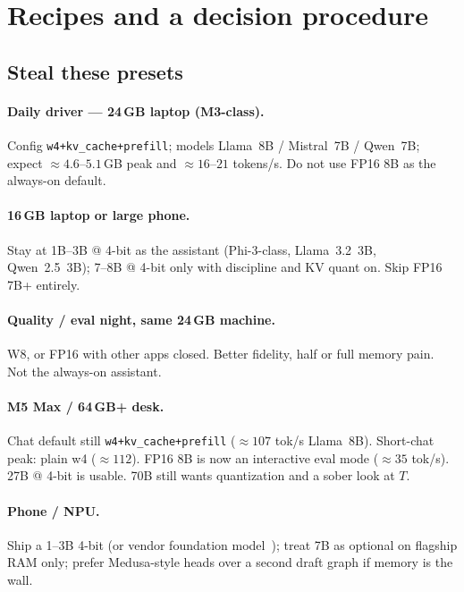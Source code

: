 \section{Recipes and a decision procedure}
\label{sec:decision}

\subsection{Steal these presets}

\paragraph{Daily driver --- 24\,GB laptop (M3-class).}
Config \texttt{w4+kv\_cache+prefill}; models Llama~8B / Mistral~7B / Qwen~7B; expect \(\approx 4.6\)--\(5.1\)\,GB peak and \(\approx 16\)--\(21\) tokens/s. Do not use FP16 8B as the always-on default.

\paragraph{16\,GB laptop or large phone.}
Stay at 1B--3B @ 4-bit as the assistant (Phi-3-class, Llama~3.2~3B, Qwen~2.5~3B); 7--8B @ 4-bit only with discipline and KV quant on. Skip FP16 7B+ entirely.

\paragraph{Quality / eval night, same 24\,GB machine.}
W8, or FP16 with other apps closed. Better fidelity, half or full memory pain. Not the always-on assistant.

\paragraph{M5 Max / 64\,GB+ desk.}
Chat default still \texttt{w4+kv\_cache+prefill} (\(\approx 107\) tok/s Llama~8B). Short-chat peak: plain w4 (\(\approx 112\)). FP16 8B is now an interactive eval mode (\(\approx 35\) tok/s). 27B @ 4-bit is usable. 70B still wants quantization and a sober look at \(T\).

\paragraph{Phone / NPU.}
Ship a 1--3B 4-bit (or vendor foundation model~\citep{gunter2024apple,abdin2024phi3}); treat 7B as optional on flagship RAM only; prefer Medusa-style heads over a second draft graph if memory is the wall.

